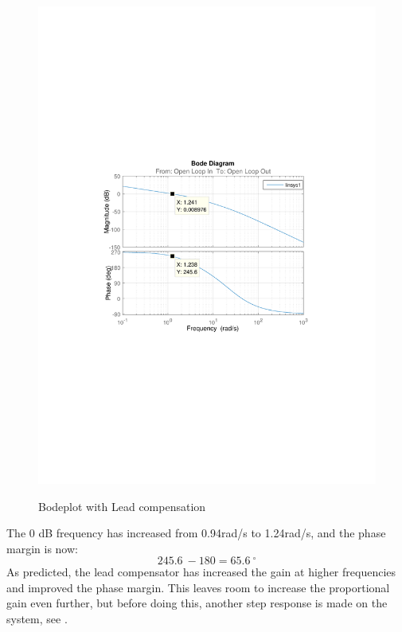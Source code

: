 \begin{figure}[H]
  \centering
  {
    \includegraphics[width=1.4\textwidth]{figures/distanceBode2.pdf}
  }
  \caption{Bodeplot with Lead compensation}
  \label{SimulationSteeringB2}
\end{figure}
The 0 dB frequency has increased from \SI{0,94}{}rad/s to \SI{1,24}{}rad/s, and the phase margin is now: $$\SI{245,6}{}-180=\SI{65,6}{^\circ}$$
As predicted, the lead compensator has increased the gain at higher frequencies and improved the phase margin. This leaves room to increase the proportional gain even further, but before doing this, another step response is made on the system, see .

